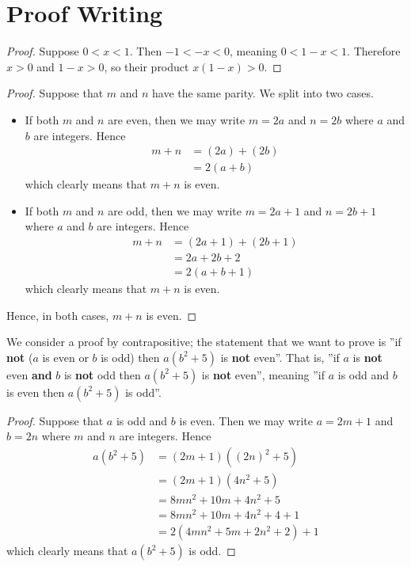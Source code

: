 \section{Proof Writing}
\begin{questions}
    \item \begin{proof}
        Suppose $0 < x < 1$. Then $-1 < -x < 0$, meaning $0 < 1 - x < 1$. Therefore $x > 0$ and $1-x > 0$, so their product $x(1-x) > 0$.
    \end{proof}

    \item \begin{proof}
        Suppose that $m$ and $n$ have the same parity. We split into two cases.
        \begin{itemize}
            \item If both $m$ and $n$ are even, then we may write $m = 2a$ and $n = 2b$ where $a$ and $b$ are integers. Hence
            \begin{align*}
                m + n &= (2a) + (2b) \\
                &= 2(a+b)
            \end{align*}
            which clearly means that $m + n$ is even.
            \item If both $m$ and $n$ are odd, then we may write $m = 2a + 1$ and $n = 2b + 1$ where $a$ and $b$ are integers. Hence
            \begin{align*}
                m + n &= (2a + 1) + (2b + 1)\\
                &= 2a + 2b + 2\\
                &= 2(a + b + 1)
            \end{align*}
            which clearly means that $m+n$ is even.
        \end{itemize}
    Hence, in both cases, $m + n$ is even.
    \end{proof}
    
    \item We consider a proof by contrapositive; the statement that we want to prove is ''if \textbf{not} ($a$ is even or $b$ is odd) then $a(b^2+5)$ is \textbf{not} even''. That is, ''if $a$ is \textbf{not} even \textbf{and} $b$ is \textbf{not} odd then $a(b^2+5)$ is \textbf{not} even'', meaning ''if $a$ is odd and $b$ is even then $a(b^2+5)$ is odd''.
    
    \begin{proof}
        Suppose that $a$ is odd and $b$ is even. Then we may write $a = 2m + 1$ and $b = 2n$ where $m$ and $n$ are integers. Hence
        \begin{align*}
            a(b^2+5) &= (2m+1)\left((2n)^2 + 5\right)\\
            &= (2m+1)(4n^2 + 5)\\
            &= 8mn^2 + 10m + 4n^2 + 5\\
            &= 8mn^2 + 10m + 4n^2 + 4 + 1\\
            &= 2(4mn^2 + 5m + 2n^2 + 2) + 1
        \end{align*}
    which clearly means that $a(b^2+5)$ is odd.
    \end{proof}
    

\end{questions}
